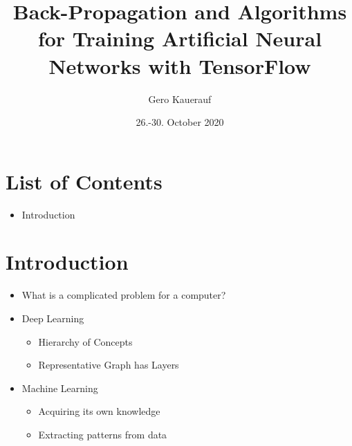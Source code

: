 \documentclass[t]{beamer}
\begin{document}

\title{Back-Propagation and Algorithms for Training Artificial Neural Networks with TensorFlow}
\date{26.-30. October 2020}
\author{Gero Kauerauf}

\frame{\titlepage}

\section{List of Contents}
\begin{frame}
    \begin{itemize}
        \item Introduction
    \end{itemize}
\end{frame}


\section{Introduction}
\begin{frame}
    \begin{itemize}
        \item What is a complicated problem for a computer?
        \item Deep Learning
        \begin{itemize}
            \item Hierarchy of Concepts
            \item Representative Graph has Layers
        \end{itemize}
        \item Machine Learning
        \begin{itemize}
            \item Acquiring its own knowledge
            \item Extracting patterns from data
        \end{itemize}
    \end{itemize}
\end{frame}
\end{document}
